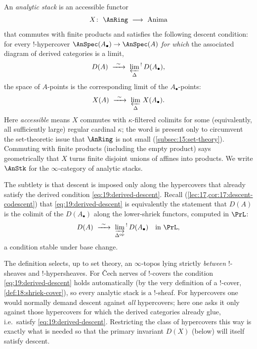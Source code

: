 \begin{definition}
\label{def:19:analytic-stack}
An \emph{analytic stack} is an accessible functor
\begin{equation*}
X\colon\ \AnRing\ \longrightarrow\ \operatorname{Anima}
\end{equation*}
that commutes with finite products and satisfies the following descent
condition: for every $!$-hypercover $\AnSpec(A_\bullet)\to\AnSpec(A)$
\emph{for which} the associated diagram of derived categories is a limit,
\begin{equation}
\label{eq:19:derived-descent}
D(A)\ \xrightarrow{\ \sim\ }\ \varprojlim_{\Delta}{}^{!}\,D(A_\bullet),
\end{equation}
the space of $A$-points is the corresponding limit of the $A_\bullet$-points:
\begin{equation}
\label{eq:19:stack-descent}
X(A)\ \xrightarrow{\ \sim\ }\ \varprojlim_{\Delta}\,X(A_\bullet).
\end{equation}
Here \emph{accessible} means $X$ commutes with $\kappa$-filtered colimits for
some (equivalently, all sufficiently large) regular cardinal $\kappa$; the word
is present only to circumvent the set-theoretic issue that $\AnRing$ is not
small (\cref{subsec:15:set-theory}). Commuting with finite products (including
the empty product) says geometrically that $X$ turns finite disjoint unions of
affines into products. We write $\AnStk$ for the $\infty$-category of analytic
stacks.
\end{definition}

The subtlety is that descent is imposed only along the hypercovers that already
satisfy the derived condition \eqref{eq:19:derived-descent}. Recall
(\cref{lec:17,cor:17:descent-codescent}) that \eqref{eq:19:derived-descent} is
equivalently the statement that $D(A)$ is the colimit of the $D(A_\bullet)$
along the lower-shriek functors, computed in $\PrL$:
\begin{equation*}
D(A)\ \xrightarrow{\ \sim\ }\ \varinjlim_{\Delta^{\mathrm{op}}}{}^{!}\,D(A_\bullet)
\quad\text{in }\PrL,
\end{equation*}
a condition stable under base change.

\begin{remark}
\label{rmk:19:intermediate-topos}
The definition selects, up to set theory, an $\infty$-topos lying strictly
\emph{between} $!$-sheaves and $!$-hypersheaves. For \v Cech nerves of
$!$-covers the condition \eqref{eq:19:derived-descent} holds automatically (by
the very definition of a $!$-cover, \cref{def:18:shriek-cover}), so every
analytic stack is a $!$-sheaf. For hypercovers one would normally demand descent
against \emph{all} hypercovers; here one asks it only against those hypercovers
for which the derived categories already glue, i.e.\ satisfy
\eqref{eq:19:derived-descent}. Restricting the class of hypercovers this way is
exactly what is needed so that the primary invariant $D(X)$ (below) will itself
satisfy descent.
\end{remark}

